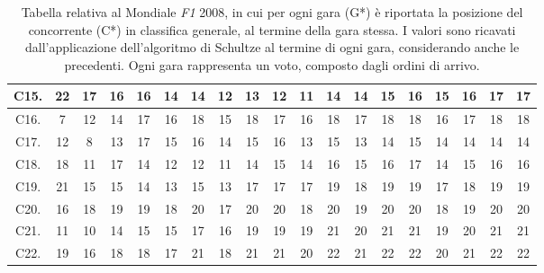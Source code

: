 \documentclass[12pt,a4paper,openright,twoside]{book}
\begin{document}
\begin{table}[H]
{\begin{tabular}{|c|c|c|c|c|c|c|c|c|c|c|c|c|c|c|c|c|c|c|}
    C15.  & 22 & 17 & 16 & 16 & 14 & 14 & 12 & 13 & 12 & 11 & 14 & 14 & 15 & 16 & 15 & 16 & 17 & 17 \\ \hline
    C16.  & 7 & 12 & 14 & 17 & 16 & 18 & 15 & 18 & 17 & 16 & 18 & 17 & 18 & 18 & 16 & 17 & 18 & 18 \\ \hline
    C17.  & 12 & 8 & 13 & 17 & 15 & 16 & 14 & 15 & 16 & 13 & 15 & 13 & 14 & 15 & 14 & 14 & 14 & 14 \\ \hline
    C18.  & 18 & 11 & 17 & 14 & 12 & 12 & 11 & 14 & 15 & 14 & 16 & 15 & 16 & 17 & 14 & 15 & 16 & 16 \\ \hline
    C19.  & 21 & 15 & 15 & 14 & 13 & 15 & 13 & 17 & 17 & 17 & 19 & 18 & 19 & 19 & 17 & 18 & 19 & 19 \\ \hline
    C20. & 16 & 18 & 19 & 19 & 18 & 20 & 17 & 20 & 20 & 18 & 20 & 19 & 20 & 20 & 18 & 19 & 20 & 20 \\ \hline
    C21.  & 11 & 10 & 14 & 15 & 15 & 17 & 16 & 19 & 19 & 19 & 21 & 20 & 21 & 21 & 19 & 20 & 21 & 21 \\ \hline
    C22.  & 19 & 16 & 18 & 18 & 17 & 21 & 18 & 21 & 21 & 20 & 22 & 21 & 22 & 22 & 20 & 21 & 22 & 22 \\ \hline
    \end{tabular}}
    \endgroup

    \caption{Tabella relativa al Mondiale \textit{F1} 2008, in cui per ogni gara (G*)  è riportata la posizione del concorrente (C*) in classifica generale, al termine della gara stessa.
    I valori sono ricavati dall'applicazione dell'algoritmo di Schultze al termine di ogni gara, considerando anche le precedenti.
    Ogni gara rappresenta un voto, composto dagli ordini di arrivo.
    }
    \label{table:classifichegeneralischultze2008tabella}
\end{table}
\end{document}
